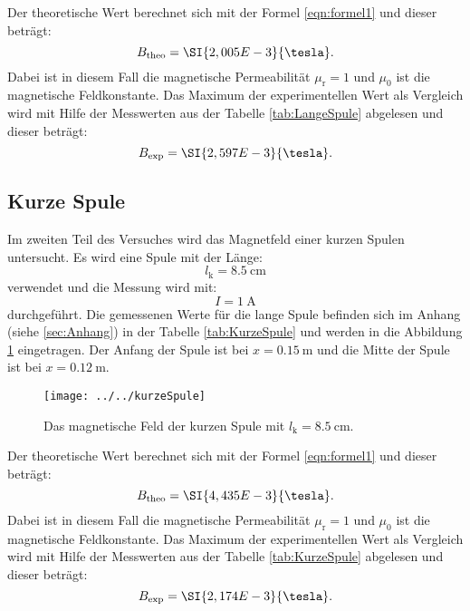 \FloatBarrier
Der theoretische Wert berechnet sich mit der Formel \ref{eqn:formel1} und dieser beträgt:
\begin{equation*}
B_{\text{theo}} = \SI{2,005 E-3}{\tesla}.
\end{equation*}
Dabei ist in diesem Fall die magnetische Permeabilität $\mu_{\text{r}} = 1$ und $\mu_{0}$ ist die magnetische Feldkonstante. 
Das Maximum der experimentellen Wert als Vergleich wird mit Hilfe der Messwerten aus der Tabelle \ref{tab:LangeSpule} abgelesen und dieser beträgt:
\begin{equation*}
B_{\text{exp}} = \SI{2,597 E-3}{\tesla}.
\end{equation*}

\subsection{Kurze Spule}
Im zweiten Teil des Versuches wird das Magnetfeld einer kurzen Spulen untersucht. Es wird eine Spule mit der Länge:
\begin{equation*}
l_{\text{k}} = \SI{8,5}{\cm}
\end{equation*}
verwendet und die Messung wird mit:
\begin{equation*}
I = \SI{1}{\ampere}
\end{equation*}
durchgeführt. Die gemessenen Werte für die lange Spule befinden sich im Anhang (siehe \ref{sec:Anhang}) in der Tabelle \ref{tab:KurzeSpule} und werden in die Abbildung \ref{fig:kurzespule} eingetragen. Der Anfang der Spule ist bei $x = \SI{0.15}{\meter} $ und die Mitte der Spule ist bei $x = \SI{0.12}{\meter}$. 
\begin{figure}[h!]
	\centering
	\texttt{[image: ../../kurzeSpule]}
	\caption{Das magnetische Feld der kurzen Spule mit $l_{\text{k}} = \SI{8,5}{\cm}$.}
	\label{fig:kurzespule}
\end{figure}

Der theoretische Wert berechnet sich mit der Formel \ref{eqn:formel1}  und dieser beträgt:
\begin{equation*}
B_{\text{theo}} = \SI{4,435 E-3}{\tesla}.
\end{equation*}
Dabei ist in diesem Fall die magnetische Permeabilität $\mu_{\text{r}} = 1$ und $\mu_{0}$ ist die magnetische Feldkonstante. 
Das Maximum der experimentellen Wert als Vergleich wird mit Hilfe der Messwerten aus der Tabelle \ref{tab:KurzeSpule} abgelesen und dieser beträgt:
\begin{equation*}
B_{\text{exp}} = \SI{2,174 E-3}{\tesla}.
\end{equation*}

